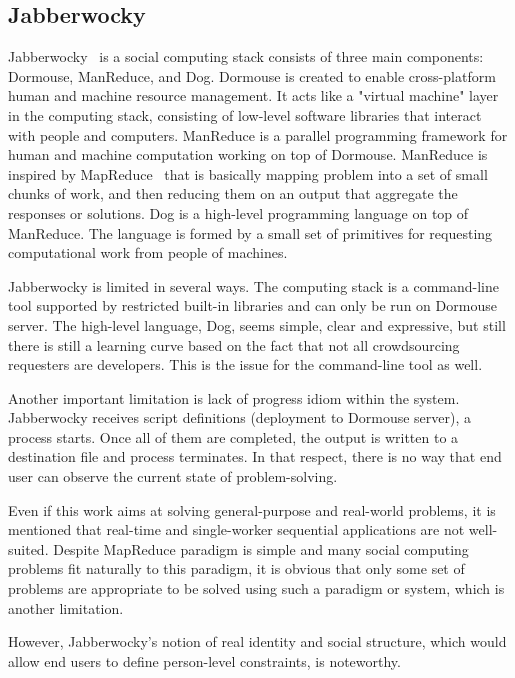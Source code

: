 \subsection{Jabberwocky}
Jabberwocky~\cite{Ahmad2011} is a social computing stack consists of three 
main components: Dormouse, ManReduce, and Dog. Dormouse is created to 
enable cross-platform human and machine resource management. It acts like a 
"virtual machine" layer in the computing stack, consisting of low-level software 
libraries that interact with people and computers. ManReduce is a parallel 
programming framework for human and machine computation working on top 
of Dormouse. ManReduce is inspired by MapReduce~\cite{Dean2008} that is 
basically mapping problem into a set of small chunks of work, and then reducing 
them on an output that aggregate the responses or solutions. Dog is a high-level 
programming language on top of ManReduce. The language is formed by a small 
set of primitives for requesting computational work from people of machines. 

Jabberwocky is limited in several ways. The computing stack is a command-line 
tool supported by restricted built-in libraries and can only be run on Dormouse server. 
The high-level language, Dog, seems simple, clear and expressive, but still there is 
still a learning curve based on the fact that not all crowdsourcing requesters are 
developers. This is the issue for the command-line tool as well.

Another important limitation is lack of progress idiom within the system. 
Jabberwocky receives script definitions (deployment to Dormouse server), 
a process starts. Once all of them are completed, the output is written to a destination 
file and process terminates. In that respect, there is no way that end user can 
observe the current state of problem-solving.

Even if this work aims at solving general-purpose and real-world problems, 
it is mentioned that real-time and single-worker sequential applications are not 
well-suited. Despite MapReduce paradigm is simple and many social computing 
problems fit naturally to this paradigm, it is obvious that only some set of problems are 
appropriate to be solved using such a paradigm or system, which is another limitation. 

However, Jabberwocky's notion of real identity and social structure, 
which would allow end users to define person-level constraints, is noteworthy.



